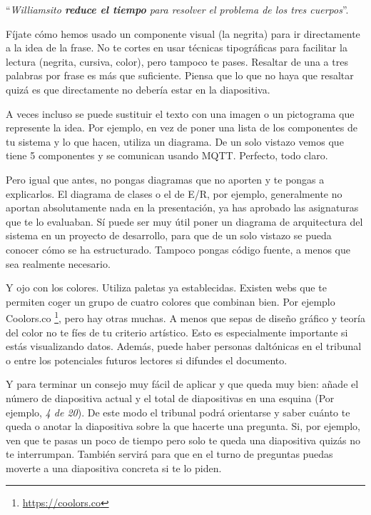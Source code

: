 ``\textit{Williamsito \textbf{reduce el tiempo} para resolver el problema de los tres cuerpos}''. 

Fíjate cómo hemos usado un componente visual (la negrita) para ir directamente a la idea de la frase. No te cortes en usar técnicas tipográficas para facilitar la lectura (negrita, cursiva, color), pero tampoco te pases. Resaltar de una a tres palabras por frase es más que suficiente. Piensa que lo que no haya que resaltar quizá es que directamente no debería estar en la diapositiva.

A veces incluso se puede sustituir el texto con una imagen o un pictograma que represente la idea. Por ejemplo, en vez de poner una lista de los componentes de tu sistema y lo que hacen, utiliza un diagrama. De un solo vistazo vemos que tiene 5 componentes y se comunican usando MQTT. Perfecto, todo claro. 

Pero igual que antes, no pongas diagramas que no aporten y te pongas a explicarlos. El diagrama de clases o el de E/R, por ejemplo, generalmente no aportan absolutamente nada en la presentación, ya has aprobado las asignaturas que te lo evaluaban. Sí puede ser muy útil poner un diagrama de arquitectura del sistema en un proyecto de desarrollo, para que de un solo vistazo se pueda conocer cómo se ha estructurado. Tampoco pongas código fuente, a menos que sea realmente necesario.

Y ojo con los colores. Utiliza paletas ya establecidas. Existen webs que te permiten coger un grupo de cuatro colores que combinan bien. Por ejemplo Coolors.co \footnote{\url{https://coolors.co}}, pero hay otras muchas. A menos que sepas de diseño gráfico y teoría del color no te fíes de tu criterio artístico. Esto es especialmente importante si estás visualizando datos. Además, puede haber personas daltónicas en el tribunal o entre los potenciales futuros lectores si difundes el documento.


Y para terminar un consejo muy fácil de aplicar y que queda muy bien: añade el número de diapositiva actual y el total de diapositivas en una esquina (Por ejemplo, \textit{4 de 20}). De este modo el tribunal podrá orientarse y saber cuánto te queda o anotar la diapositiva sobre la que hacerte una pregunta. Si, por ejemplo, ven que te pasas un poco de tiempo pero solo te queda una diapositiva quizás no te interrumpan. También servirá para que en el turno de preguntas puedas moverte a una diapositiva concreta si te lo piden.


